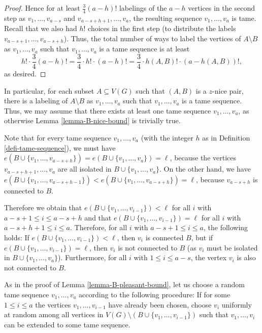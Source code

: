 \documentclass[11pt]{article}
\theoremstyle{definition}
\numberwithin{equation}{section}
\begin{document}
\begin{proof}
Hence for at least $\frac{3}{4}(a-h)!$ labelings of the $a-h$ vertices in the second step as $v_1,\dots,v_{a-s}$ and $v_{a-s+h+1},\dots,v_a$, the resulting sequence $v_1,\dots,v_a$ is tame. Recall that we also had $h!$ choices in the first step (to distribute the labels $v_{a-s+1},\dots,v_{a-s+h}$). Thus, the total number of ways to  label the vertices of $A\setminus B$ as $v_1,\dots,v_a$ such that $v_1,\dots,v_a$ is a tame sequence is at least
\[h!\cdot\frac{3}{4}(a-h)!=\frac{3}{4}\cdot  h!\cdot (a-h)!=\frac{3}{4}\cdot  h(A,B)!\cdot (a-h(A,B))!,\]
as desired.
\end{proof}

In particular, for each subset $A\subseteq V(G)$ such that $(A,B)$ is a $z$-nice pair, there is a labeling of $A\setminus B$ as $v_1,\dots,v_a$ such that $v_1,\dots,v_a$ is a tame sequence. Thus, we may assume that there exists at least one tame sequence $v_1,\dots,v_a$, as otherwise Lemma \ref{lemma-B-nice-bound} is trivially true.

Note that for every tame sequence $v_1,\dots,v_a$ (with the integer $h$ as in Definition \ref{defi-tame-sequence}), we must have $e(B\cup \lbrace v_1,\dots,v_{a-s+h}\rbrace)=e(B\cup \lbrace v_1,\dots,v_a\rbrace)=\ell$, because the vertices $v_{a-s+h+1},\dots,v_a$ are all isolated in $B\cup \lbrace v_1,\dots,v_a\rbrace$. On the other hand, we have $e(B\cup \lbrace v_1,\dots,v_{a-s+h-1}\rbrace)<e(B\cup \lbrace v_1,\dots,v_{a-s+h}\rbrace)=\ell$, because $v_{a-s+h}$ is connected to $B$.

Therefore we obtain that $e(B\cup \lbrace v_1,\dots,v_{i-1}\rbrace)<\ell$ for all $i$ with $a-s+1\leq i\leq a-s+h$ and that $e(B\cup \lbrace v_1,\dots,v_{i-1}\rbrace)=\ell$ for all $i$ with $a-s+h+1\leq i\leq a$. Therefore, for all $i$ with $a-s+1\leq i\leq a$, the following holds: If $e(B\cup \lbrace v_1,\dots,v_{i-1}\rbrace)<\ell$, then $v_i$ is connected $B$, but if $e(B\cup \lbrace v_1,\dots,v_{i-1}\rbrace)=\ell$, then $v_i$ is not connected to $B$ (as $v_i$ must be isolated in $B\cup \lbrace v_1,\dots,v_a\rbrace$). Furthermore, for all $i$ with $1\leq i\leq a-s$, the vertex $v_i$ is also not connected to $B$.

As in the proof of Lemma \ref{lemma-B-pleasant-bound}, let us choose a random tame sequence $v_1,\dots,v_a$ according to the following procedure: If for some $1\leq i\leq a$ the vertices $v_1,\dots, v_{i-1}$ have already been chosen, choose $v_{i}$ uniformly at random among all vertices in $V(G)\setminus (B\cup \lbrace v_1,\dots, v_{i-1}\rbrace)$ such that $v_1,\dots, v_{i}$ can be extended to some tame sequence.
\end{document}
